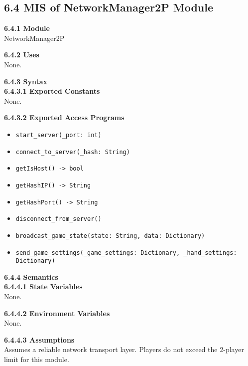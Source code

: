 \documentclass[12pt, titlepage]{article}
\begin{document}
\subsection*{6.4 MIS of NetworkManager2P Module}
\textbf{6.4.1 Module}\\
NetworkManager2P

\textbf{6.4.2 Uses}\\
None.

\textbf{6.4.3 Syntax}\\
\textbf{6.4.3.1 Exported Constants}\\
None.  

\textbf{6.4.3.2 Exported Access Programs}
\begin{itemize}
    \item \texttt{start\_server(\_port: int)}
    \item \texttt{connect\_to\_server(\_hash: String)}
    \item \texttt{getIsHost() -> bool}
    \item \texttt{getHashIP() -> String}
    \item \texttt{getHashPort() -> String}
    \item \texttt{disconnect\_from\_server()}
    \item \texttt{broadcast\_game\_state(state: String, data: Dictionary)}
    \item \texttt{send\_game\_settings(\_game\_settings: Dictionary, \_hand\_settings: Dictionary)}
\end{itemize}

\textbf{6.4.4 Semantics}\\
\textbf{6.4.4.1 State Variables}\\
None.

\textbf{6.4.4.2 Environment Variables}\\
None.

\textbf{6.4.4.3 Assumptions}\\
Assumes a reliable network transport layer. Players do not exceed the 2-player limit for this module.
\end{document}

